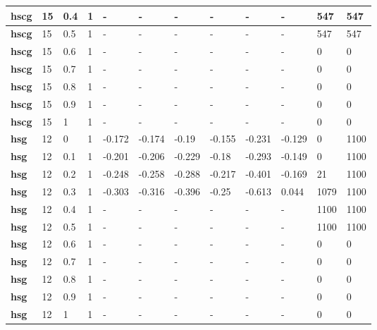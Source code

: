 \begin{table}[h]
\begin{tabular}[h]{|l|l|l|l|l|l|l|l|l|l|l|l|
    }
    \\ \hline
  \textbf{hscg} & 15         & 0.4 & 1 & - & - & - & - & - & - &  547 &  547
    \\ \hline
  \textbf{hscg} & 15         & 0.5 & 1 & - & - & - & - & - & - &  547 &  547
    \\ \hline
  \textbf{hscg} & 15         & 0.6 & 1 & - & - & - & - & - & - &    0 &    0
    \\ \hline
  \textbf{hscg} & 15         & 0.7 & 1 & - & - & - & - & - & - &    0 &    0
    \\ \hline
  \textbf{hscg} & 15         & 0.8 & 1 & - & - & - & - & - & - &    0 &    0
    \\ \hline
  \textbf{hscg} & 15         & 0.9 & 1 & - & - & - & - & - & - &    0 &    0
    \\ \hline
  \textbf{hscg} & 15         &   1 & 1 & - & - & - & - & - & - &    0 &    0
    \\ \hline
  \textbf{hsg } & 12         &   0 & 1 & -0.172 & -0.174 &  -0.19 & -0.155 & -0.231 & -0.129 &    0 & 1100
    \\ \hline
  \textbf{hsg } & 12         & 0.1 & 1 & -0.201 & -0.206 & -0.229 &  -0.18 & -0.293 & -0.149 &    0 & 1100
    \\ \hline
  \textbf{hsg } & 12         & 0.2 & 1 & -0.248 & -0.258 & -0.288 & -0.217 & -0.401 & -0.169 &   21 & 1100
    \\ \hline
  \textbf{hsg } & 12         & 0.3 & 1 & -0.303 & -0.316 & -0.396 &  -0.25 & -0.613 &  0.044 & 1079 & 1100
    \\ \hline
  \textbf{hsg } & 12         & 0.4 & 1 & - & - & - & - & - & - & 1100 & 1100
    \\ \hline
  \textbf{hsg } & 12         & 0.5 & 1 & - & - & - & - & - & - & 1100 & 1100
    \\ \hline
  \textbf{hsg } & 12         & 0.6 & 1 & - & - & - & - & - & - &    0 &    0
    \\ \hline
  \textbf{hsg } & 12         & 0.7 & 1 & - & - & - & - & - & - &    0 &    0
    \\ \hline
  \textbf{hsg } & 12         & 0.8 & 1 & - & - & - & - & - & - &    0 &    0
    \\ \hline
  \textbf{hsg } & 12         & 0.9 & 1 & - & - & - & - & - & - &    0 &    0
    \\ \hline
  \textbf{hsg } & 12         &   1 & 1 & - & - & - & - & - & - &    0 &    0
    \\ \hline
 \end{tabular}
 \end{table}
